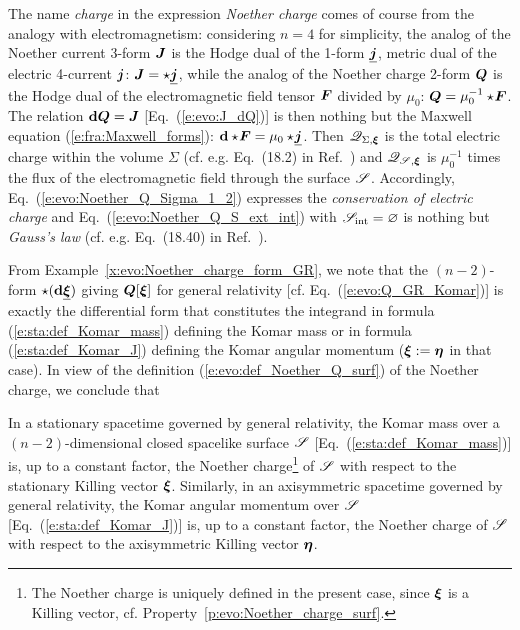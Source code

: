 \begin{remark}
\label{r:evo:charge_em_analogy}
The name \emph{charge} in the expression \emph{Noether charge} comes of course from the analogy
with electromagnetism: considering $n=4$ for simplicity, the analog of the Noether current 3-form $\bm{J}$ is the Hodge dual of the 1-form $\underline{\bm{j}}$, metric dual of the electric 4-current $\bm{j}$:
$\bm{J} = \star\underline{\bm{j}}$, while the analog of the Noether charge 2-form $\bm{Q}$ is the Hodge dual
of the electromagnetic field tensor $\bm{F}$ divided by $\mu_0$: $\bm{Q} =\mu_0^{-1}\star\!\bm{F}$. The relation
$\mathbf{d} \bm{Q} = \bm{J}$ [Eq.~(\ref{e:evo:J_dQ})] is then nothing but the Maxwell
equation (\ref{e:fra:Maxwell_forms}): $\mathbf{d}\star\!\bm{F} = \mu_0 \star\!\underline{\bm{j}}$.
Then $\mathscr{Q}_{\Sigma,\bm{\xi}}$ is the total electric charge within the volume $\Sigma$
(cf. e.g. Eq.~(18.2) in Ref.~\cite{Gourg13}) and $\mathscr{Q}_{\mathscr{S},\bm{\xi}}$ is $\mu_0^{-1}$ times the flux of the electromagnetic
field through the surface $\mathscr{S}$. Accordingly,
Eq.~(\ref{e:evo:Noether_Q_Sigma_1_2}) expresses the \emph{conservation of electric charge}
and Eq.~(\ref{e:evo:Noether_Q_S_ext_int})
with $\mathscr{S}_{\rm int} = \varnothing$ is nothing but \emph{Gauss's law} (cf. e.g. Eq.~(18.40) in Ref.~\cite{Gourg13}).
\end{remark}

From Example~\ref{x:evo:Noether_charge_form_GR},
we note that the $(n-2)$-form $\star (\mathbf{d} \underline{\bm{\xi}})$ giving $\bm{Q}[\bm{\xi}]$
for general relativity [cf. Eq.~(\ref{e:evo:Q_GR_Komar})]
is exactly the differential form that constitutes the integrand in
formula (\ref{e:sta:def_Komar_mass}) defining the Komar mass or in formula
(\ref{e:sta:def_Komar_J}) defining the Komar angular momentum ($\bm{\xi} := \bm{\eta}$ in that case).
In view of the definition (\ref{e:evo:def_Noether_Q_surf}) of the Noether charge, we conclude that

\begin{prop}
\label{p:evo:Komar_Noether}
In a stationary spacetime governed by general relativity, the Komar mass over a $(n-2)$-dimensional closed spacelike surface $\mathscr{S}$
[Eq.~(\ref{e:sta:def_Komar_mass})]
is, up to a constant factor,
the Noether charge\footnote{The Noether charge is uniquely defined in the present case, since
$\bm{\xi}$ is a Killing vector, cf. Property~\ref{p:evo:Noether_charge_surf}.}
of $\mathscr{S}$ with respect to the stationary Killing vector $\bm{\xi}$.
Similarly, in an axisymmetric spacetime governed by general relativity,
the Komar angular momentum over $\mathscr{S}$ [Eq.~(\ref{e:sta:def_Komar_J})] is, up to a constant factor,
the Noether charge of $\mathscr{S}$ with respect to the axisymmetric Killing vector $\bm{\eta}$.
\end{prop}

